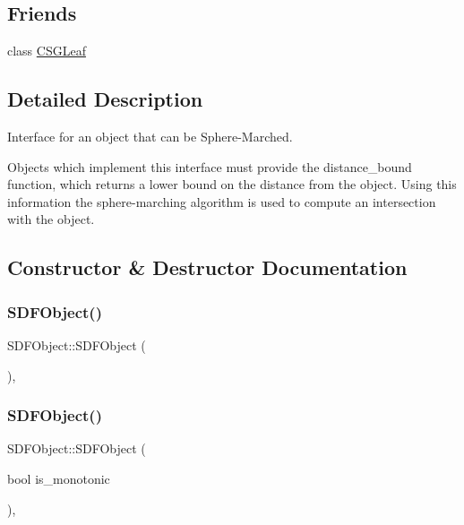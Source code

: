 \subsection*{Friends}
\begin{DoxyCompactItemize}
\item 
class \mbox{\hyperlink{classSDFObject_a31075b2d3758d4b9e5804142372a4eb4}{C\+S\+G\+Leaf}}
\end{DoxyCompactItemize}


\subsection{Detailed Description}
Interface for an object that can be Sphere-\/\+Marched. 

Objects which implement this interface must provide the distance\+\_\+bound function, which returns a lower bound on the distance from the object. Using this information the sphere-\/marching algorithm is used to compute an intersection with the object. 

\subsection{Constructor \& Destructor Documentation}
\mbox{\label{classSDFObject_a9aeb5037eb692e6502ae2c523ed87b29}} 
\subsubsection{\texorpdfstring{SDFObject()}{SDFObject()}\hspace{0.1cm}{\footnotesize\ttfamily [1/3]}}
{\footnotesize\ttfamily S\+D\+F\+Object\+::\+S\+D\+F\+Object (\begin{DoxyParamCaption}{ }\end{DoxyParamCaption})\hspace{0.3cm}{\ttfamily [inline]}, {\ttfamily [explicit]}}

\mbox{\label{classSDFObject_a56fffe33b0be8b81e2a38df61d09ccfd}} 
\subsubsection{\texorpdfstring{SDFObject()}{SDFObject()}\hspace{0.1cm}{\footnotesize\ttfamily [2/3]}}
{\footnotesize\ttfamily S\+D\+F\+Object\+::\+S\+D\+F\+Object (\begin{DoxyParamCaption}\item[{bool}]{is\+\_\+monotonic }\end{DoxyParamCaption})\hspace{0.3cm}{\ttfamily [inline]}, {\ttfamily [explicit]}}

